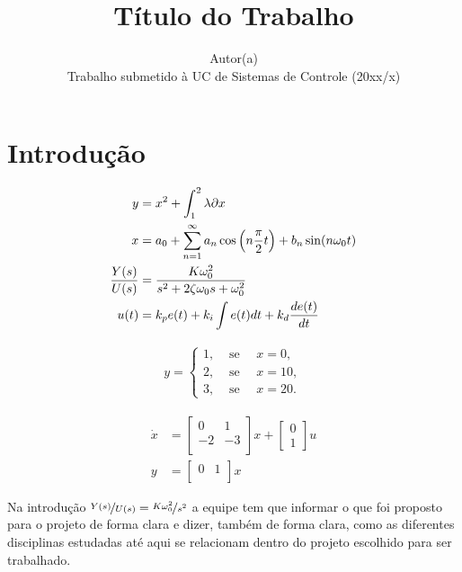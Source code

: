 \documentclass{article}
\title{\textbf{Título do Trabalho}}
\author{Autor(a) \\ [0.5em] Trabalho submetido à UC de Sistemas de Controle (20xx/x)}
\date{}
\begin{document}
\maketitle
\thispagestyle{fancy}



\section{Introdução}


 

\begin{align}
    y &= x^{2} +\int_{1}^{2} \lambda \partial x \\
    x &= a_{0} + \sum_{n=1}^{\infty} a_{n} \cos\left(n\frac{\pi}{2} t\right) +b_{n} \sin(n\omega_0 t) \notag \\
    \frac{Y(s)}{U(s)} &= \frac{K\omega_0^2}{s^2 +2\zeta\omega_0 s +\omega_0^2} \\
    u(t) &= k_p e(t) +k_i\int e(t) dt +k_d \frac{de(t)}{dt} \label{eq:one}
\end{align}


\begin{align}
     y=\begin{cases}
 1, & \text{ se }\quad x= 0,\\
 2, & \text{ se }\quad x= 10,\\
 3, & \text{ se }\quad x= 20.
\end{cases}
\end{align}

\begin{align}
    \dot{x} &= \begin{bmatrix}
0 & 1 \\
-2 & -3 \\
\end{bmatrix} x + \begin{bmatrix}
0 \\
1
\end{bmatrix} u \\
y &= \begin{bmatrix}
0 & 1 \\
\end{bmatrix} x
\end{align}





Na introdução $\nicefrac{Y(s)}{U(s)} = \nicefrac{K\omega_0^2}{s^2}$ a equipe tem que informar o que foi proposto para o projeto de forma clara e dizer, também de forma clara, como as diferentes disciplinas estudadas até aqui se relacionam dentro do projeto escolhido para ser trabalhado. 
\end{document}
